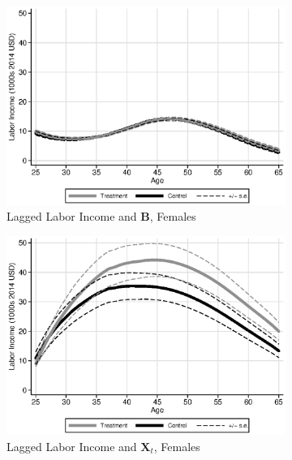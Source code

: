 \begin{figure}
\centering
\caption{Predicted Labor Income Profiles, Varying the Prediction Variables}\label{fig:matchsensitivity}
\begin{subfigure}[h]{0.3\textwidth}
		\centering
		\caption{Lagged Labor Income and $\bm{B}$, Females} 
		\includegraphics[width=\textwidth]{output/labor_25-65_pset3_mset3_female.eps}
\end{subfigure}%
\begin{subfigure}[h]{0.3\textwidth}
	\centering
	\caption{Lagged Labor Income and $\bm{X}_{t}$, Females} 
		\includegraphics[width=\textwidth]{output/labor_25-65_pset6_mset3_female.eps}
\end{subfigure}%
\begin{subfigure}[h]{0.3\textwidth}
	\centering

\end{subfigure}
\end{figure}
